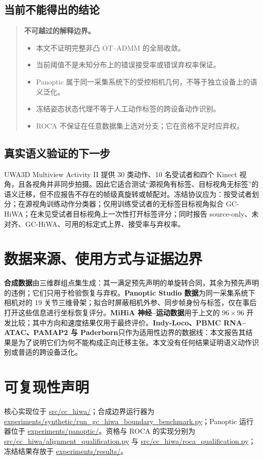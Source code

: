 \documentclass[10pt,a4paper,fontset=windows]{ctexart}
\theoremstyle{definition}
\theoremstyle{remark}
\begin{document}
\subsection{当前不能得出的结论}
\begin{quote}\small
\textbf{不可越过的解释边界。}
\begin{itemize}
  \item 本文不证明完整非凸 OT--ADMM 的全局收敛。
  \item 当前阈值不是未知分布上的错误接受率或错误弃权率保证。
  \item Panoptic 属于同一采集系统下的受控相机几何，不等于独立设备上的语义泛化。
  \item 冻结姿态状态代理不等于人工动作标签的跨设备动作识别。
  \item ROCA 不保证在任意数据集上选对分支；它在资格不足时应弃权。
\end{itemize}
\end{quote}

\subsection{真实语义验证的下一步}
UWA3D Multiview Activity II 提供 30 类动作、10 名受试者和四个 Kinect 视角，且各视角并非同步拍摄\cite{uwa3dii}。因此它适合测试“源视角有标签、目标视角无标签”的语义迁移，但不应报告不存在的帧级真旋转或帧配对。冻结协议应为：按受试者划分；在源视角训练动作分类器；仅用训练受试者的无标签目标视角拟合 GC-HiWA；在未见受试者目标视角上一次性打开标签评分；同时报告 source-only、未对齐、GC-HiWA、可用的标定式上界、接受率与弃权率。

\section{数据来源、使用方式与证据边界}
\textbf{合成数据}由三维群组点集生成：其一满足预先声明的单旋转合同，其余为预先声明的违例；它们只用于检验恢复与弃权。\textbf{Panoptic Studio 数据}为同一采集系统下相机对的 19 关节三维骨架；拟合时屏蔽相机外参、同步帧身份与标签，仅在事后打开这些信息进行坐标恢复评分。\textbf{MiHiA 神经--运动数据}用于上文的 $96\times96$ 开发比较；其中方向和速度结果仅用于最终评价。\textbf{Indy-Loco、PBMC RNA--ATAC、PAMAP2 与 Paderborn}只作为适用性边界的数据线：本文报告其结果是为了说明它们为何不能构成正向迁移主张。本文没有任何结果证明语义动作识别或普适的跨设备泛化。

\section{可复现性声明}
\label{sec:reproducibility}
核心实现位于 \url{src/cc_hiwa/}；合成边界运行器为 \url{experiments/synthetic/run_gc_hiwa_boundary_benchmark.py}；Panoptic 运行器位于 \url{experiments/panoptic/}。资格与 ROCA 的实现分别为 \url{src/cc_hiwa/alignment_qualification.py} 与 \url{src/cc_hiwa/roca_qualification.py}；冻结结果存放于 \url{experiments/results/}。
\end{document}
